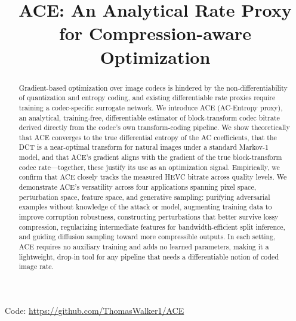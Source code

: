 \documentclass{article}
\title{ACE: An Analytical Rate Proxy for Compression-aware Optimization}
\author{%
  \TODO{authors}
}
\theoremstyle{definition}
\begin{document}
\maketitle

\begin{abstract}
    Gradient-based optimization over image codecs is hindered by the non-differentiability of quantization and entropy coding, and existing differentiable rate proxies require training a codec-specific surrogate network. 
    We introduce ACE (AC-Entropy proxy), an analytical, training-free, differentiable estimator of block-transform codec bitrate derived directly from the codec's own transform-coding pipeline. 
    We show theoretically that ACE converges to the true differential entropy of the AC coefficients, that the DCT is a near-optimal transform for natural images under a standard Markov-1 model, and that ACE's gradient aligns with the gradient of the true block-transform codec rate—together, these justify its use as an optimization signal. 
    Empirically, we confirm that ACE closely tracks the measured HEVC bitrate across quality levels. 
    We demonstrate ACE's versatility across four applications spanning pixel space, perturbation space, feature space, and generative sampling: purifying adversarial examples without knowledge of the attack or model, augmenting training data to improve corruption robustness, constructing perturbations that better survive lossy compression, regularizing intermediate features for bandwidth-efficient split inference, and guiding diffusion sampling toward more compressible outputs. 
    In each setting, ACE requires no auxiliary training and adds no learned parameters, making it a lightweight, drop-in tool for any pipeline that needs a differentiable notion of coded image rate.
\end{abstract}

\begin{center}
    Code: \url{https://github.com/ThomasWalker1/ACE}
\end{center}
\end{document}
